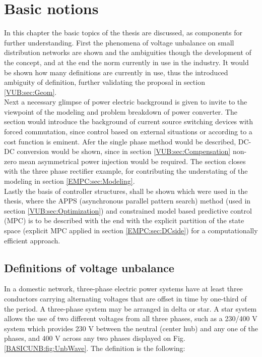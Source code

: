 \chapter{Basic notions}\label{BASIC:sec:main}

In this chapter the basic topics of the thesis are discussed, as components for further understanding. First the phenomena of voltage unbalance on small distribution networks are shown and the ambiguities though the development of the concept, and at the end the norm currently in use in the industry. It would be shown how many definitions are currently in use, thus the introduced ambiguity of definition, further validating the proposal in section \ref{VUB:sec:Geom}.\\
Next a necessary glimpse of power electric background is given to invite to the viewpoint of the modeling and problem breakdown of power converter. The section would introduce the background of current source switching devices with forced commutation, since control based on external situations or according to a cost function is eminent. Afer the single phase method would be described, DC-DC conversion would be shown, since in section \ref{VUB:sec:Compensation} non-zero mean asymmetrical power injection would be required. The section closes with the three phase rectifier example, for contributing the understating of the modeling in section \ref{EMPC:sec:Modeling}.\\
Lastly the basis of controller structures, shall be shown which were used in the thesis, where the APPS (asynchronous parallel pattern search) method (used in section \ref{VUB:sec:Optimization}) and constrained model based predictive control (MPC) is to be described with the end with the explicit partition of the state space (explicit MPC applied in section \ref{EMPC:sec:DCside}) for a computationally efficient approach.

	\section{Definitions of voltage unbalance}\label{BASICUNB:sec:DefinitionsofUNB}

	In a domestic network, three-phase electric power systems have at least three conductors carrying alternating voltages that are offset in time by one-third of the period. A three-phase system may be arranged in delta  or star. A star system allows the use of two different voltages from all three phases, such as a 230/400 V system which provides 230 V between the neutral (center hub) and any one of the phases, and 400 V across any two phases displayed on Fig.\ref{BASICUNB:fig:UnbWave}. The definition is the following:
	
